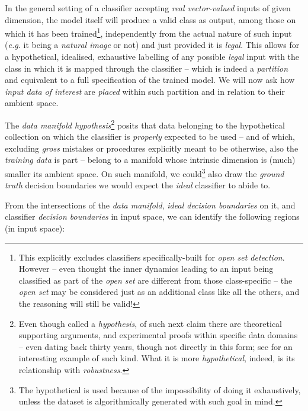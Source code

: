 In the general setting of a classifier accepting \textit{real vector-valued} inputs of given dimension, the model itself will produce a valid class as output, among those on which it has been trained\footnote{This explicitly excludes classifiers specifically-built for \textit{open set detection}. However -- even thought the inner dynamics leading to an input being classified as part of the \textit{open set} are different from those class-specific -- the \textit{open set} may be considered just as an additional class like all the others, and the reasoning will still be valid!}, independently from the actual nature of such input (\textit{e.g.} it being a \textit{natural image} or not) and just provided it is \textit{legal}. This allows for a hypothetical, idealised, exhaustive labelling of any possible \textit{legal} input with the class in which it is mapped through the classifier -- which is indeed a \textit{partition} and equivalent to a full specification of the trained model. We will now ask how \textit{input data of interest} are \textit{placed} within such partition and in relation to their ambient space.

The \textit{data manifold hypothesis}\footnote{Even though called a \textit{hypothesis}, of such next claim there are theoretical supporting arguments, and experimental proofs within specific data domains -- even dating back thirty years, though not directly in this form; see \cite{Laughlin1994FlyEye} for an interesting example of such kind. What it is more \textit{hypothetical}, indeed, is its relationship with \textit{robustness}.} posits that data belonging to the hypothetical collection on which the classifier is \textit{properly} expected to be used -- and of which, excluding \textit{gross} mistakes or procedures explicitly meant to be otherwise, also the \textit{training data} is part -- belong to a manifold whose intrinsic dimension is (much) smaller \wrt its ambient space. On such manifold, we could\footnote{The hypothetical is used because of the impossibility of doing it exhaustively, unless the dataset is algorithmically generated with such goal in mind.} also draw the \textit{ground truth} decision boundaries we would expect the \textit{ideal} classifier to abide to.

From the intersections of the \textit{data manifold}, \textit{ideal decision boundaries} on it, and classifier \textit{decision boundaries} in input space, we can identify the following regions (in input space):

